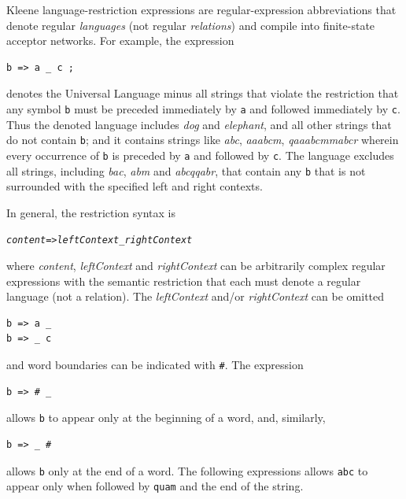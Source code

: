 \documentclass[letterpaper,12pt]{article}
\begin{document}
Kleene language-restriction expressions are regular-expression
abbreviations that denote regular \emph{languages} (not regular
\emph{relations}) and compile into finite-state acceptor networks.  For
example, the expression

\begin{Verbatim}[fontsize=\small]
b => a _ c ;
\end{Verbatim}

\noindent
denotes the Universal Language minus all strings that violate
the restriction that any symbol \texttt{b} must
be preceded immediately by \texttt{a} and followed immediately by
\texttt{c}.  Thus the denoted language includes \emph{dog} and
\emph{elephant}, and all other strings that do not contain
\texttt{b}; and it contains strings like \emph{abc}, \emph{aaabcm},
\emph{qaaabcmmabcr} wherein every occurrence of \texttt{b} is
preceded by \texttt{a} and followed by \texttt{c}.  The language
excludes all strings, including \emph{bac}, \emph{abm} and
\emph{abcqqabr}, that contain any \texttt{b} that is not surrounded
with the specified left and right contexts.

In general, the restriction syntax is

\begin{alltt}
\emph{content} => \emph{leftContext} _ \emph{rightContext}
\end{alltt}

\noindent
where \emph{content}, \emph{leftContext} and \emph{rightContext}
can be arbitrarily complex regular expressions with the semantic
restriction that each must denote a regular language (not a
relation).  The \emph{leftContext} and/or \emph{rightContext} can
be omitted

\begin{Verbatim}[fontsize=\small]
b => a _
b => _ c
\end{Verbatim}

\noindent
and word boundaries can be indicated with \texttt{\#}.  The
expression

\begin{Verbatim}[fontsize=\small]
b => # _
\end{Verbatim}

\noindent
allows \texttt{b} to appear only at the beginning of a word, and,
similarly,

\begin{Verbatim}[fontsize=\small]
b => _ #
\end{Verbatim}

\noindent
allows \texttt{b} only at the end of a word.  The following
expressions allows \texttt{abc} to appear only when followed by
\texttt{quam} and the end of the string.
\end{document}
